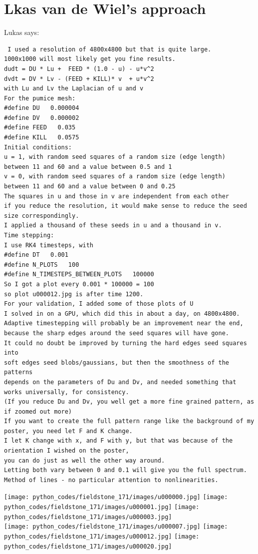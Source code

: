 \section*{Lkas van de Wiel's approach}

Lukas says:
\begin{verbatim}
 I used a resolution of 4800x4800 but that is quite large.
1000x1000 will most likely get you fine results.
dudt = DU * Lu +  FEED * (1.0 - u) - u*v^2
dvdt = DV * Lv - (FEED + KILL)* v  + u*v^2
with Lu and Lv the Laplacian of u and v
For the pumice mesh:
#define DU   0.000004
#define DV   0.000002
#define FEED   0.035
#define KILL   0.0575
Initial conditions:
u = 1, with random seed squares of a random size (edge length) 
between 11 and 60 and a value between 0.5 and 1
v = 0, with random seed squares of a random size (edge length) 
between 11 and 60 and a value between 0 and 0.25
The squares in u and those in v are independent from each other
if you reduce the resolution, it would make sense to reduce the seed size correspondingly.
I applied a thousand of these seeds in u and a thousand in v.
Time stepping:
I use RK4 timesteps, with
#define DT   0.001
#define N_PLOTS   100
#define N_TIMESTEPS_BETWEEN_PLOTS   100000
So I got a plot every 0.001 * 100000 = 100
so plot u000012.jpg is after time 1200.
For your validation, I added some of those plots of U
I solved in on a GPU, which did this in about a day, on 4800x4800.
Adaptive timestepping will probably be an improvement near the end,  
because the sharp edges around the seed squares will have gone.
It could no doubt be improved by turning the hard edges seed squares into 
soft edges seed blobs/gaussians, but then the smoothness of the patterns
depends on the parameters of Du and Dv, and needed something that works universally, for consistency.
(If you reduce Du and Dv, you well get a more fine grained pattern, as if zoomed out more)
If you want to create the full pattern range like the background of my poster, you need let F and K change.
I let K change with x, and F with y, but that was because of the orientation I wished on the poster,
you can do just as well the other way around.
Letting both vary between 0 and 0.1 will give you the full spectrum.
Method of lines - no particular attention to nonlinearities. 
\end{verbatim}

\begin{center}
\texttt{[image: python\_codes/fieldstone\_171/images/u000000.jpg]}
\texttt{[image: python\_codes/fieldstone\_171/images/u000001.jpg]}
\texttt{[image: python\_codes/fieldstone\_171/images/u000003.jpg]}\\
\texttt{[image: python\_codes/fieldstone\_171/images/u000007.jpg]}
\texttt{[image: python\_codes/fieldstone\_171/images/u000012.jpg]}
\texttt{[image: python\_codes/fieldstone\_171/images/u000020.jpg]}
\end{center}

